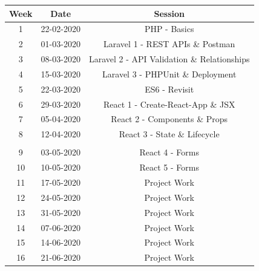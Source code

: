 \documentclass{article}
\begin{document}
\renewcommand{\arraystretch}{1.5}
\begin{tabular}{|c|c|c|c|}
	\hline
	\textbf{Week} & \textbf{Date}     & \multicolumn{2}{c|}{\textbf{Session}}        \\ \hline
	\small 1      & \small 22-02-2020 & \multicolumn{2}{c|}{\small PHP - Basics} \\ \hline
	\small 2      & \small 01-03-2020 & \multicolumn{2}{c|}{\small Laravel 1 - REST APIs \& Postman} \\ \hline
	\small 3      & \small 08-03-2020 & \multicolumn{2}{c|}{\small Laravel 2 - API Validation \& Relationships}          \\ \hline
	\small 4      & \small 15-03-2020 & \multicolumn{2}{c|}{\small Laravel 3 - PHPUnit \& Deployment}            \\ \hline
	\small 5      & \small 22-03-2020 & \multicolumn{2}{c|}{\small ES6 - Revisit}            \\ \hline
	\small 6      & \small 29-03-2020 & \multicolumn{2}{c|}{\small React 1 - Create-React-App \& JSX}            \\ \hline
	\small 7      & \small 05-04-2020 & \multicolumn{2}{c|}{\small React 2 - Components \& Props}       \\ \hline
	\small 8      & \small 12-04-2020 & \multicolumn{2}{c|}{\small React 3 - State \& Lifecycle}            \\ \hline
	\rowcolor{yellow} \multicolumn{4}{|c|}{\small Mid Term Break}                    \\ \hline
	\small 9      & \small 03-05-2020 & \multicolumn{2}{c|}{\small React 4 - Forms}     \\ \hline
	\small 10     & \small 10-05-2020 & \multicolumn{2}{c|}{\small React 5 - Forms}     \\ \hline
	\small 11     & \small 17-05-2020 & \multicolumn{2}{c|}{\small Project Work}     \\ \hline
	\small 12     & \small 24-05-2020 & \multicolumn{2}{c|}{\small Project Work}     \\ \hline
	\small 13     & \small 31-05-2020 & \multicolumn{2}{c|}{\small Project Work}     \\ \hline
	\small 14     & \small 07-06-2020 & \multicolumn{2}{c|}{\small Project Work}     \\ \hline
	\small 15     & \small 14-06-2020 & \multicolumn{2}{c|}{\small Project Work}     \\ \hline
	\small 16     & \small 21-06-2020 & \multicolumn{2}{c|}{\small Project Work}     \\ \hline
\end{tabular}
\end{document}

